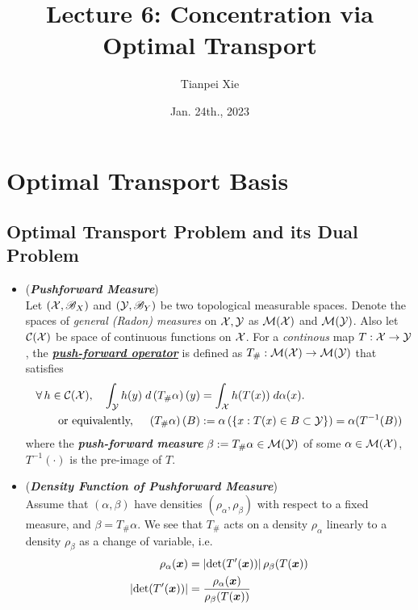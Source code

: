 \documentclass[11pt]{article}
\begin{document}
\title{Lecture 6: Concentration via Optimal Transport}
\author{ Tianpei Xie}
\date{Jan. 24th., 2023 }
\maketitle
\tableofcontents
\newpage
\section{Optimal Transport Basis}
\subsection{Optimal Transport Problem and its Dual Problem}
\begin{itemize}
\item \begin{definition} (\textbf{\emph{Pushforward Measure}})  \citep{gabriel2019computational} \\
Let $({\mathcal X}, {\mathscr B}_X)$ and $({\mathcal Y}, {\mathscr B}_Y)$ be two topological measurable spaces.  Denote the spaces of  \emph{general (Radon) measures} on ${\mathcal X}, {\mathcal Y}$  as ${\mathcal M}({\mathcal X})$ and ${\mathcal M}({\mathcal Y})$. Also let  ${\mathcal C}({\mathcal X})$ be space of continuous functions on ${\mathcal X}$. For a \emph{continous} map $T : {\mathcal X} \rightarrow {\mathcal Y}$,  the \underline{\textbf{\emph{push-forward operator}}} is defined as $T_{\#}: {\mathcal M}({\mathcal X}) \rightarrow {\mathcal M}({\mathcal Y})$ that  satisfies 
\begin{align}
\forall\, h\in {\mathcal C}({\mathcal X}), \quad \int_{{\mathcal Y}}h(y)\; d \left(T_{\#}\alpha\right)(y) &= \int_{{\mathcal X}}h(T(x))\; d\alpha(x). \label{eqn: def_push_forward_opt}\\
\text{or equivalently, } \quad \left(T_{\#}\alpha\right)(B)&:= \alpha\left(\left\{x: T(x) \in B \subset {\mathcal Y} \right\}\right) = \alpha(T^{-1}(B))  \label{eqn: def_push_forward_opt2}
\end{align} where the \textbf{\emph{push-forward measure}} $\beta := T_{\#}\alpha \in {\mathcal M}({\mathcal Y})$ of some $\alpha \in  {\mathcal M}({\mathcal X})$, $T^{-1}(\cdot)$ is the pre-image of $T$.
\end{definition}

\item \begin{remark} (\textbf{\emph{Density Function of Pushforward Measure}})\\
Assume that $(\alpha, \beta)$ have densities $(\rho_{\alpha}, \rho_{\beta})$ with respect to a fixed measure, and $\beta = T_{\#}\alpha$. We see that $T_{\#}$ acts on a density $\rho_{\alpha}$ linearly to a density $\rho_{\beta}$ as a change of variable, i.e. 
\begin{align}
\rho_{\alpha}(\boldsymbol{x}) &= \left\lvert \det(T'(\boldsymbol{x})) \right\rvert\rho_{\beta}(T(\boldsymbol{x}))  \label{eqn: density of push-forward distribution}\\
\left\lvert \det(T'(\boldsymbol{x})) \right\rvert &= \frac{\rho_{\alpha}(\boldsymbol{x}) }{\rho_{\beta}(T(\boldsymbol{x})) } \nonumber
\end{align}
\end{remark}



\end{itemize}
\end{document}

